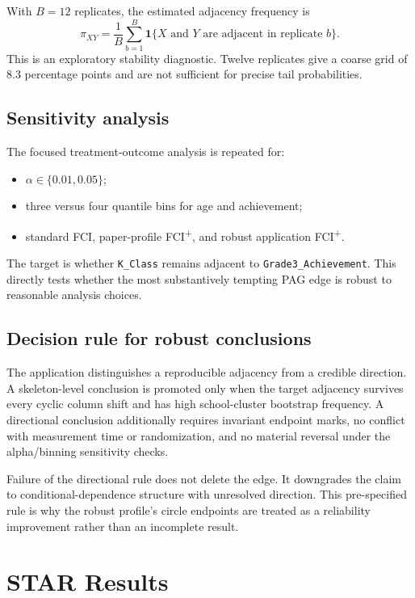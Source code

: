 \documentclass[11pt,a4paper,oneside]{report}
\newcommand{\FCIplus}{FCI\textsuperscript{+}}
\newcommand{\code}[1]{\texttt{#1}}
\begin{document}
With \(B=12\) replicates, the estimated adjacency frequency is
\[
  \widehat{\pi}_{XY}
  = \frac{1}{B}\sum_{b=1}^{B}
    \mathbf{1}\{X\text{ and }Y\text{ are adjacent in replicate }b\}.
\]
This is an exploratory stability diagnostic. Twelve replicates give a coarse
grid of 8.3 percentage points and are not sufficient for precise tail
probabilities.

\section{Sensitivity analysis}

\enlargethispage{3\baselineskip}

The focused treatment-outcome analysis is repeated for:

\begin{itemize}[leftmargin=2em]
  \item \(\alpha\in\{0.01,0.05\}\);
  \item three versus four quantile bins for age and achievement;
  \item standard FCI, paper-profile \FCIplus{}, and robust application
        \FCIplus{}.
\end{itemize}

The target is whether \code{K\_Class} remains adjacent to
\code{Grade3\_Achievement}. This directly tests whether the most
substantively tempting PAG edge is robust to reasonable analysis choices.

\section{Decision rule for robust conclusions}

The application distinguishes a reproducible adjacency from a credible
direction. A skeleton-level conclusion is promoted only when the target
adjacency survives every cyclic column shift and has high school-cluster
bootstrap frequency. A directional conclusion additionally requires invariant
endpoint marks, no conflict with measurement time or randomization, and no
material reversal under the alpha/binning sensitivity checks.

Failure of the directional rule does not delete the edge. It downgrades the
claim to conditional-dependence structure with unresolved direction. This
pre-specified rule is why the robust profile's circle endpoints are treated as
a reliability improvement rather than an incomplete result.

\chapter{STAR Results}
\end{document}
